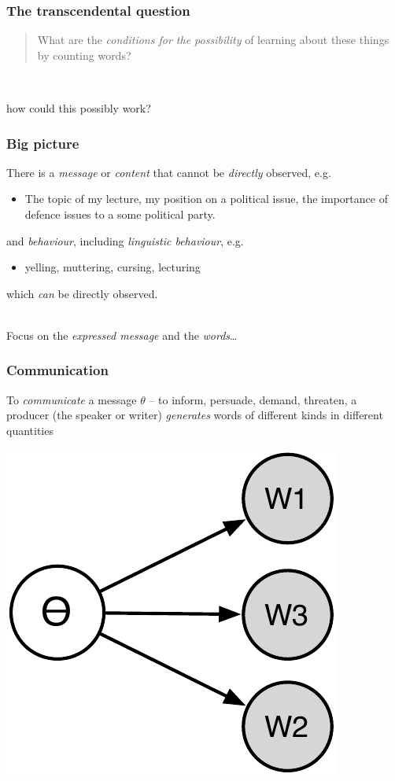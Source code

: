 \documentclass[11pt,compress,professionalfonts]{beamer}
\newcommand{\ita}{\begin{itemize}}
\newcommand{\itm}{\item[]}
\newcommand{\itz}{\end{itemize}}
\begin{document}
\begin{frame}\frametitle{The transcendental question}

\begin{quote}
What are the \textit{conditions for the possibility} of learning about these things by counting words?
\end{quote}

~\\
\centerline{how could this possibly work?}


\end{frame}
\begin{frame}[t]\frametitle{Big picture}

There is a \textsl{message} or \textit{content} that cannot be \textit{directly} observed, e.g.
\ita
\itm The topic of my lecture, my position on a political issue, the importance of defence issues to a some political party.
\itz
and \textit{behaviour}, including \textsl{linguistic behaviour}, e.g.
\ita
\itm yelling, muttering, cursing, lecturing
\itz
which \textit{can} be directly observed.

~\\
Focus on the \textit{expressed message} and the \textit{words}\ldots

\end{frame}
\begin{frame}[t]\frametitle{Communication}

To \textsl{communicate} a message $\theta$ -- to inform, persuade, demand, threaten, a producer (the speaker or writer) \textsl{generates} words of different kinds in different quantities


\begin{center}
\includegraphics[scale=.9]{pictures/gen}
\end{center}

\end{frame}
\end{document}
